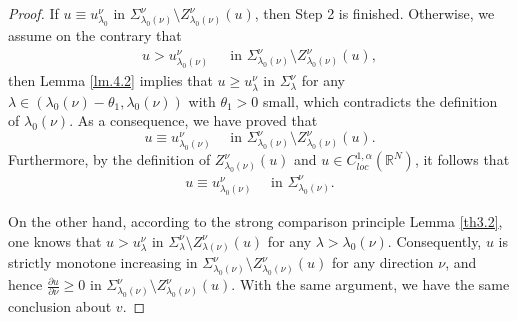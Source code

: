 \documentclass[12pt]{amsart}
\theoremstyle{definition}
\theoremstyle{remark}
\theoremstyle{conclusion}
\theoremstyle{conjecture}
\numberwithin{equation}{section}
\newcommand{\R}{\mathbb{R}}
\begin{document}
\begin{proof}
\smallskip

If $u\equiv u^\nu_{\lambda_0}$ in $\Sigma^\nu_{\lambda_0(\nu)}\setminus Z^\nu_{\lambda_{0}(\nu)}(u)$, then Step 2 is finished. Otherwise, we assume on the contrary that
\begin{align}\label{eq2305009}
u > u^\nu_{\lambda_0(\nu)} \quad\,\,\,\mbox{in}\,\,\Sigma^\nu_{\lambda_0(\nu)} \setminus Z^\nu_{\lambda_0(\nu)}(u),
\end{align}
then Lemma \ref{lm.4.2} implies that $u\geq u_\lambda^\nu$ in $\Sigma_\lambda^\nu$ for any $\lambda\in(\lambda_0(\nu)-\theta_1, \lambda_0(\nu))$ with $\theta_{1}>0$ small, which contradicts the definition of $\lambda_0(\nu)$. As a consequence, we have proved that
$$ u\equiv u^\nu_{\lambda_0(\nu)} \,\,\quad \mbox{in}\,\, \Sigma^\nu_{\lambda_0(\nu)} \setminus Z^\nu_{\lambda_0(\nu)}(u).$$
Furthermore, by the definition of $Z^\nu_{\lambda_0(\nu)}(u)$ and $u\in C_{loc}^{1,\alpha}(\R^N)$, it follows that
\begin{align}\label{eq23050091}
u\equiv u^\nu_{\lambda_0(\nu)} \quad\,\,\mbox{in} \,\,\Sigma^\nu_{\lambda_0(\nu)}.
\end{align}


On the other hand, according to the strong comparison principle Lemma \ref{th3.2}, one knows that
$ u > u^\nu_{\lambda}$ in $\Sigma^\nu_\lambda\setminus Z^\nu_{\lambda(\nu)}(u)$ for any $\lambda > \lambda_0(\nu)$.    %
Consequently, $u$ is strictly monotone increasing in $\Sigma^\nu_{\lambda_0(\nu)}\setminus Z^\nu_{\lambda_0(\nu)}(u)$ for any direction $\nu$, and hence $\frac{\partial u}{\partial \nu} \geq 0$ in $\Sigma^\nu_{\lambda_0(\nu)} \setminus Z^\nu_{\lambda_0(\nu)}(u)$. With the same argument, we have the same conclusion about $v$.
%


\end{proof}
\end{document}

